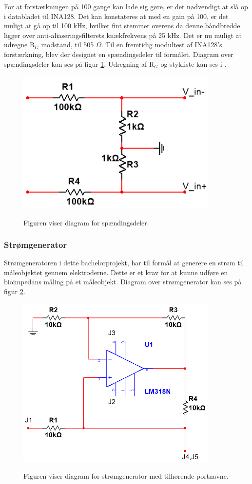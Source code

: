 For at forstærkningen på 100 gange kan lade sig gøre, er det nødvendigt at slå op i databladet til INA128. Det kan konstateres at med en gain på 100, er det muligt at gå op til 100 kHz, hvilket fint stemmer overens da denne båndbredde  ligger over anti-aliaseringsfilterets knækfrekvens på 25 kHz. Det er nu muligt at udregne R$_{G}$ modstand, til 505 $\Omega$. Til en fremtidig modultest af INA128's forstærkning, blev der designet en spændingsdeler til formålet. Diagram over spændingsdeler kan ses på figur \ref{fig:spaedingdeler}. Udregning af R$_{G}$ og stykliste kan ses i .

\begin{figure}[H]
\centering
{\includegraphics[width=10cm]
{Figure/spaedingdeler}}
\caption{Figuren viser diagram for spændingsdeler.}
\label{fig:spaedingdeler}
\end{figure}

 
 
\subsubsection{Strømgenerator}
Strømgeneratoren i dette bachelorprojekt, har til formål at generere en strøm til måleobjektet gennem elektroderne. Dette er et krav for at kunne udføre en bioimpedans måling på et måleobjekt\cite{Brantlov2017}. Diagram over strømgenerator kan ses på figur \ref{fig:StromgeneratorLM318}.

\begin{figure}[H]
\centering
{\includegraphics[width=10cm]
{Figure/StromgeneratorLM318}}
\caption{Figuren viser diagram for strømgenerator med tilhørende portnavne.}
\label{fig:StromgeneratorLM318}
\end{figure}

